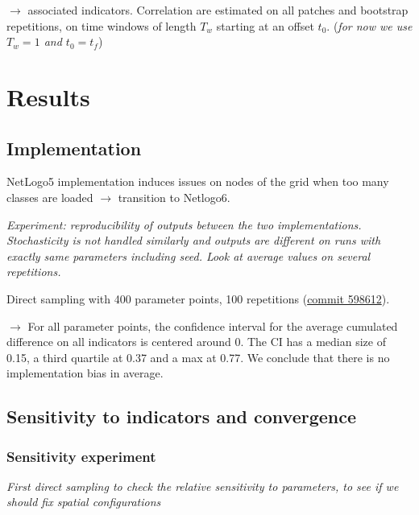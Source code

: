 $\rightarrow$ associated indicators. Correlation are estimated on all patches and bootstrap repetitions, on time windows of length $T_w$ starting at an offset $t_0$. (\textit{for now we use $T_w = 1$ and $t_0 = t_f$})



\section{Results}


\subsection{Implementation}

NetLogo5 implementation induces issues on nodes of the grid when too many classes are loaded $\rightarrow$ transition to Netlogo6.

\textit{Experiment: reproducibility of outputs between the two implementations. Stochasticity is not handled similarly and outputs are different on runs with exactly same parameters including seed. Look at average values on several repetitions.}

Direct sampling with 400 parameter points, 100 repetitions (\href{https://github.com/JusteRaimbault/Governance/commit/598612118729afe4d606880582027f9cbb3a2b03}{commit 598612}).


$\rightarrow$ For all parameter points, the confidence interval for the average cumulated difference on all indicators is centered around 0. The CI has a median size of 0.15, a third quartile at 0.37 and a max at 0.77. We conclude that there is no implementation bias in average.


\subsection{Sensitivity to indicators and convergence}

\subsubsection{Sensitivity experiment}

\textit{First direct sampling to check the relative sensitivity to parameters, to see if we should fix spatial configurations}

